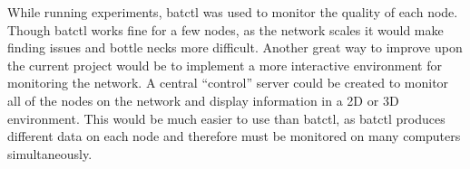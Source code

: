 While running experiments, batctl was used to monitor the quality of each node. Though batctl works fine for a few nodes, as the network scales it would make finding issues and bottle necks more difficult. Another great way to improve upon the current project would be to implement a more interactive environment for monitoring the network. A central ``control'' server could be created to monitor all of the nodes on the network and display information in a 2D or 3D environment. This would be much easier to use than batctl, as batctl produces different data on each node and therefore must be monitored on many computers simultaneously. 

